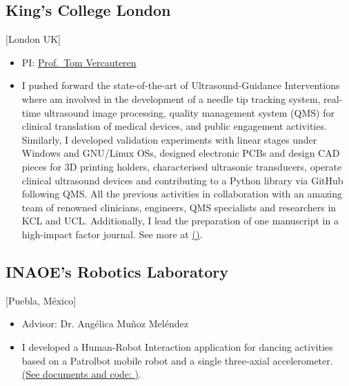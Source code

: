 \documentclass{mycv}
\begin{document}
\subsection{King's College London}[London UK]
\begin{positions}
\end{positions}
\begin{itemize}
  \item PI: \href{https://cai4cai.ml}{Prof.~Tom Vercauteren}
  \item I pushed forward the state-of-the-art of Ultrasound-Guidance Interventions
	where am involved in the development of a needle tip tracking system, real-time ultrasound image processing, 
	quality management system (QMS) for clinical translation of medical devices, and public engagement activities.
	Similarly, I developed validation experiments with linear stages under Windows and GNU/Linux OSs,
	designed electronic PCBs and design CAD pieces for 3D printing holders, characterised ultrasonic transducers,
    operate clinical ultrasound devices and contributing to a Python library via GitHub following QMS.
	All the previous activities in collaboration with an amazing 
	team of renowned clinicians, engineers, QMS specialists and researchers in KCL and UCL.
	Additionally, I lead the preparation of one manuscript in a high-impact factor journal.
	See more at \href{https://cai4cai.ml/author/miguel-xochicale/}{(\faExternalLink)}.
\end{itemize}

\newpage

\subsection{INAOE's Robotics Laboratory}[Puebla, M\'exico]
\begin{positions}
\end{positions}
\begin{itemize}
  \item Advisor: Dr. Ang\'elica Mu\~noz Mel\'endez
  \item I developed a Human-Robot Interaction application for dancing activities based on 
a Patrolbot mobile robot and a single three-axial accelerometer. 
\href{https://sites.google.com/site/perezxochicale/projects/demodance}{(See documents and code: \faExternalLink)}.
\end{itemize}
\end{document}
